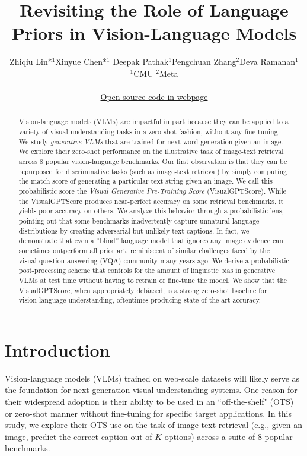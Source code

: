 \documentclass{article} \usepackage{iclr2024_conference,times}
\title{Revisiting the Role of Language Priors in Vision-Language Models}
\author{Zhiqiu Lin*$^1$\quad Xinyue Chen*$^1$ \quad Deepak Pathak$^1$\quad Pengchuan Zhang$^2$\quad Deva Ramanan$^{1}$ \\
  $^1$CMU \quad\quad $^2$Meta \\ \\
  \href{https://linzhiqiu.github.io/papers/visual_gpt_score}{Open-source code in webpage}
}
\begin{document}
\maketitle

\begin{abstract}
Vision-language models (VLMs) are impactful in part because they can be applied to a variety of visual understanding tasks in a zero-shot fashion, without any fine-tuning. We study \textit{generative VLMs} that are trained for next-word generation given an image. We explore their zero-shot performance on the illustrative task of image-text retrieval across 8 popular vision-language benchmarks. Our first observation is that they can be repurposed for discriminative tasks (such as image-text retrieval) by simply computing the match score of generating a particular text string given an image. We call this probabilistic score the {\em Visual Generative Pre-Training Score} (VisualGPTScore). While the VisualGPTScore produces near-perfect accuracy on some retrieval benchmarks, it yields poor accuracy on others. We analyze this behavior through a probabilistic lens, pointing out that some benchmarks inadvertently capture unnatural language distributions by creating adversarial but unlikely text captions. In fact, we demonstrate that even a ``blind'' language model that ignores any image evidence can sometimes outperform all prior art, reminiscent of similar challenges faced by the visual-question answering (VQA) community many years ago. We derive a probabilistic post-processing scheme that controls for the amount of linguistic bias in generative VLMs at test time without having to retrain or fine-tune the model. We show that the VisualGPTScore, when appropriately debiased, is a strong zero-shot baseline for vision-language understanding, oftentimes producing state-of-the-art accuracy.


\end{abstract}


\section{Introduction}
Vision-language models (VLMs) trained on web-scale datasets will likely serve as the foundation for next-generation visual understanding systems. One reason for their widespread adoption is their ability to be used in an ``off-the-shelf" (OTS) or zero-shot manner without fine-tuning for specific target applications. In this study, we explore their OTS use on the task of image-text retrieval (e.g., given an image, predict the correct caption out of $K$ options) across a suite of 8 popular benchmarks. 
\end{document}
